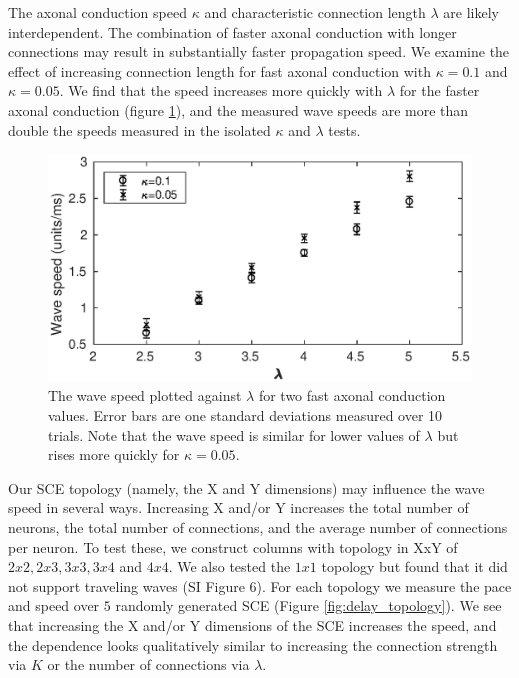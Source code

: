 The axonal conduction speed $\kappa$ and characteristic connection length $\lambda$ are likely interdependent.
The combination of faster axonal conduction with longer connections may result in substantially faster propagation speed.
We examine the effect of increasing connection length for fast axonal conduction with $\kappa=0.1$ and $\kappa=0.05$.
We find that the speed increases more quickly with $\lambda$ for the faster axonal conduction (figure \ref{fig:delay_kappalambda}), 
and the measured wave speeds are more than double the speeds measured in the isolated $\kappa$ and $\lambda$ tests. 
\begin{figure}[!htb]
 \centering
   \includegraphics[width=\textwidth]{fig/WaveSpeed_KappaLambda}
   \caption{ The wave speed plotted against $\lambda$ for two fast axonal conduction values.
	     Error bars are one standard deviations measured over 10 trials.
             Note that the wave speed is similar for lower values of $\lambda$ but rises more quickly for $\kappa=0.05$.}
   \label{fig:delay_kappalambda}
\end{figure}

\FloatBarrier


Our SCE topology (namely, the X and Y dimensions) may influence the wave speed in several ways.
Increasing X and/or Y increases the total number of neurons, the total number of connections, and the average number of connections per neuron.
To test these, we construct columns with topology in XxY of $2x2, 2x3, 3x3, 3x4$ and $4x4$.
We also tested the $1x1$ topology but found that it did not support traveling waves (SI Figure 6).
For each topology we measure the pace and speed over $5$ randomly generated SCE (Figure \ref{fig:delay_topology}).
We see that increasing the X and/or Y dimensions of the SCE increases the speed, and the dependence looks qualitatively similar to increasing the connection strength via $K$ or the number of connections via $\lambda$.

